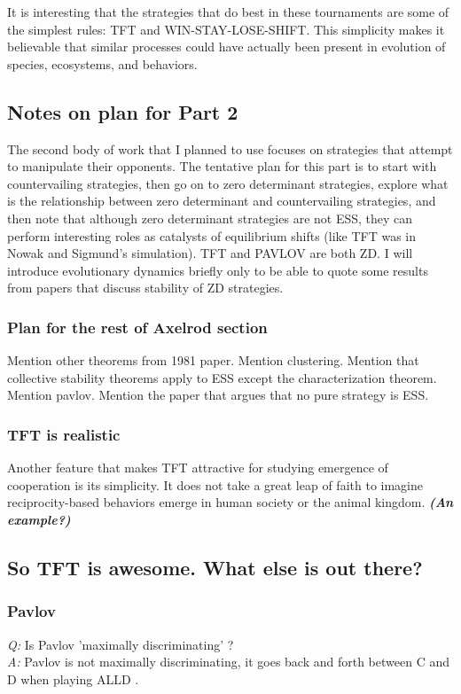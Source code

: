 It is interesting that the strategies that do best in these tournaments are some of the simplest rules: TFT and WIN-STAY-LOSE-SHIFT. This simplicity makes it believable that similar processes could have actually been present in evolution of species, ecosystems, and behaviors.

\subsection{Notes on plan for Part 2}
The second body of work that I planned to use focuses on strategies that attempt to manipulate their opponents. The tentative plan for this part is to start with countervailing strategies, then go on to zero determinant strategies, explore what is the relationship between zero determinant and countervailing strategies, and then note that although zero determinant strategies are not ESS, they can perform interesting roles as catalysts of equilibrium shifts (like TFT was in Nowak and Sigmund's simulation). TFT and PAVLOV are both ZD. I will introduce evolutionary dynamics briefly only to be able to quote some results from papers that discuss stability of ZD strategies.


\subsubsection{Plan for the rest of Axelrod section}
Mention other theorems from 1981 paper. Mention clustering. Mention that collective stability theorems apply to ESS except the characterization theorem. Mention pavlov. Mention the paper that argues that no pure strategy is ESS.

\subsubsection{TFT is realistic}
Another feature that makes TFT attractive for studying emergence of cooperation is its simplicity. It does not take a great leap of faith to imagine reciprocity-based behaviors emerge in human society or the animal kingdom. \textit{\textbf{(An example?)}}

\subsection{So TFT is awesome. What else is out there?}

\subsubsection{Pavlov}
\textit{Q:} Is Pavlov 'maximally discriminating' \cite[p.316]{RobertAxelrod_1981}?\\
\textit{A:} Pavlov is not maximally discriminating, it goes back and forth between C and D when playing ALLD \cite{Nowak1993}.

